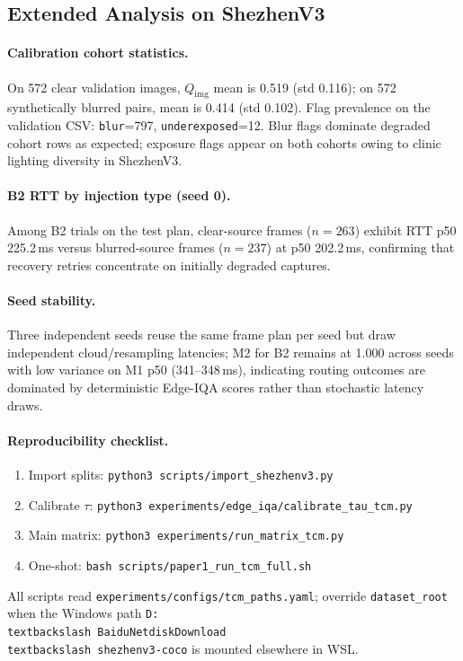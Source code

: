 \subsection{Extended Analysis on ShezhenV3}
\label{sec:extended-analysis}

\paragraph{Calibration cohort statistics.}
On 572 clear validation images, $Q_{\mathrm{img}}$ mean is 0.519 (std 0.116); on 572 synthetically blurred pairs, mean is 0.414 (std 0.102).
Flag prevalence on the validation CSV: \texttt{blur}=797, \texttt{underexposed}=12.
Blur flags dominate degraded cohort rows as expected; exposure flags appear on both cohorts owing to clinic lighting diversity in ShezhenV3.

\paragraph{B2 RTT by injection type (seed 0).}
Among B2 trials on the test plan, clear-source frames ($n=263$) exhibit RTT p50 225.2\,ms versus blurred-source frames ($n=237$) at p50 202.2\,ms, confirming that recovery retries concentrate on initially degraded captures.

\paragraph{Seed stability.}
Three independent seeds reuse the same frame plan per seed but draw independent cloud/resampling latencies; M2 for B2 remains at 1.000 across seeds with low variance on M1 p50 (341--348\,ms), indicating routing outcomes are dominated by deterministic Edge-IQA scores rather than stochastic latency draws.

\paragraph{Reproducibility checklist.}
\begin{enumerate}
  \item Import splits: \texttt{python3 scripts/import\_shezhenv3.py}
  \item Calibrate $\tau$: \texttt{python3 experiments/edge\_iqa/calibrate\_tau\_tcm.py}
  \item Main matrix: \texttt{python3 experiments/run\_matrix\_tcm.py}
  \item One-shot: \texttt{bash scripts/paper1\_run\_tcm\_full.sh}
\end{enumerate}
All scripts read \texttt{experiments/configs/tcm\_paths.yaml}; override \texttt{dataset\_root} when the Windows path \texttt{D:\\textbackslash BaiduNetdiskDownload\\textbackslash shezhenv3-coco} is mounted elsewhere in WSL.
